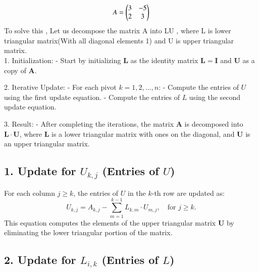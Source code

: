 \documentclass[journal]{IEEEtran}
\begin{document}
\begin{align}
A = \begin{pmatrix}3 & -5 \\ 2 & 3\end{pmatrix}
\end{align}
To solve this , Let us decompose the matrix A into LU , where L is lower triangular matrix(With all diagonal elements 1) and U is upper triangular matrix.  \\
1. Initialization: 
   - Start by initializing $ \mathbf{L} $ as the identity matrix $ \mathbf{L} = \mathbf{I} $ and $ \mathbf{U} $ as a copy of $ \mathbf{A} $.
   
2. Iterative Update:
   - For each pivot $ k = 1, 2, \ldots, n $:
     - Compute the entries of $ U $ using the first update equation.
     - Compute the entries of $ L $ using the second update equation.
   
3. Result:
   - After completing the iterations, the matrix $ \mathbf{A} $ is decomposed into $ \mathbf{L} \cdot \mathbf{U} $, where $ \mathbf{L} $ is a lower triangular matrix with ones on the diagonal, and $ \mathbf{U} $ is an upper triangular matrix.

\subsection*{1. Update for $ U_{k,j} $ (Entries of $ U $)}

For each column $ j \geq k $, the entries of $ U $ in the $ k $-th row are updated as:
\[
U_{k,j} = A_{k,j} - \sum_{m=1}^{k-1} L_{k,m} \cdot U_{m,j}, \quad \text{for } j \geq k.
\]
This equation computes the elements of the upper triangular matrix $ \mathbf{U} $ by eliminating the lower triangular portion of the matrix.

\subsection*{2. Update for $ L_{i,k} $ (Entries of $ L $)}
\end{document}
